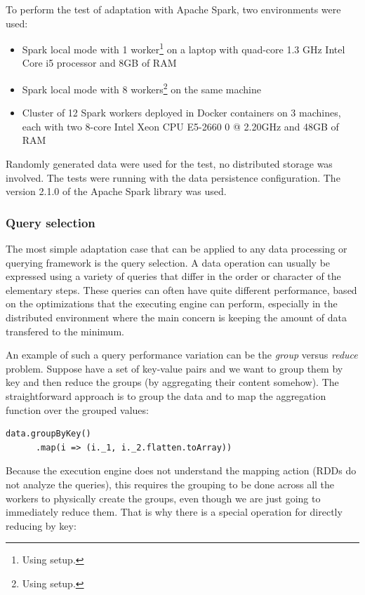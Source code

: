 To perform the test of adaptation with Apache Spark, two environments were used:

\begin{itemize}
	\item Spark local mode with 1 worker\footnote{Using  setup.} on a laptop with quad-core 1.3 GHz Intel Core i5 processor and 8GB of RAM
	\item Spark local mode with 8 workers\footnote{Using  setup.} on the same machine
	\item Cluster of 12 Spark workers deployed in Docker containers on 3 machines, each with two 8-core Intel Xeon CPU E5-2660 0 @ 2.20GHz and 48GB of RAM
\end{itemize}

Randomly generated data were used for the test, no distributed storage was involved. The tests were running with the  data persistence configuration. The version 2.1.0 of the Apache Spark library was used.

\subsubsection{Query selection}

The most simple adaptation case that can be applied to any data processing or querying framework is the query selection. A data operation can usually be expressed using a variety of queries that differ in the order or character of the elementary steps. These queries can often have quite different performance, based on the optimizations that the executing engine can perform, especially in the distributed environment where the main concern is keeping the amount of data transfered to the minimum.

An example of such a query performance variation can be the \textit{group} versus \textit{reduce} problem. Suppose have a set of key-value pairs and we want to group them by key and then reduce the groups (by aggregating their content somehow). The straightforward approach is to group the data and to map the aggregation function over the grouped values:

\lstset{style=Scala}
\begin{lstlisting}
data.groupByKey()
      .map(i => (i._1, i._2.flatten.toArray))
\end{lstlisting}

Because the execution engine does not understand the mapping action (RDDs do not analyze the queries), this requires the grouping to be done across all the workers to physically create the groups, even though we are just going to immediately reduce them. That is why there is a special operation for directly reducing by key:

